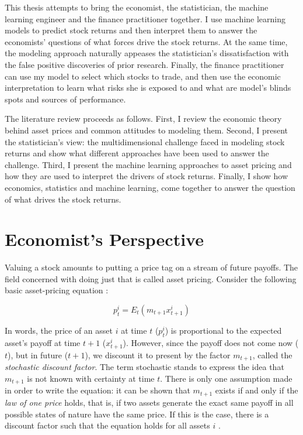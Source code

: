  	This thesis attempts to bring the economist, the statistician, the machine learning engineer and the finance practitioner together. I use machine learning models to predict stock returns and then interpret them to answer the economists' questions of what forces drive the stock returns. At the same time, the modeling approach naturally appeases the statistician's dissatisfaction with the false positive discoveries of prior research. Finally, the finance practitioner can use my model to select which stocks to trade, and then use the economic interpretation to learn what risks she is exposed to and what are model's blinds spots and sources of performance. 
 	
 	The literature review proceeds as follows. First, I review the economic theory behind asset prices and common attitudes to modeling them. Second, I present the statistician's view: the multidimensional challenge faced in modeling stock returns \citep{cochrane2011presidential} and show what different approaches have been used to answer the challenge. Third, I present the machine learning approaches to asset pricing and how they are used to interpret the drivers of stock returns. Finally, I show how economics, statistics and machine learning, come together to answer the question of what drives the stock returns. 
 	
 	\section{Economist's Perspective}
 	
	 	Valuing a stock amounts to putting a price tag on a stream of future payoffs. The field concerned with doing just that is called asset pricing. Consider the following basic asset-pricing equation \citep{cochrane2009asset}:
	 	
	 	\begin{equation}
	 		p_t^i = E_t(m_{t+1} x_{t+1}^i ) \label{eq:pEmx}
	 	\end{equation}
	 	
	 	In words, the price of an asset $i$ at time $t$ ($p_t^i$) is proportional to the expected asset's payoff at time $t+1$ ($x_{t+1}^i$). However, since the payoff does not come now ($t$), but in future ($t+1$), we discount it to present by the factor $m_{t+1}$, called the \textit{stochastic discount factor}. The term stochastic stands to express the idea that $m_{t+1}$ is not known with certainty at time $t$. There is only one assumption made in order to write the equation: it can be shown that $m_{t+1}$ exists if and only if the \textit{law of one price} holds, that is, if two assets generate the exact same payoff in all possible states of nature have the same price. If this is the case, there is a discount factor such that the equation holds for all assets $i$ \citep{cochrane2009asset}.
	 	

